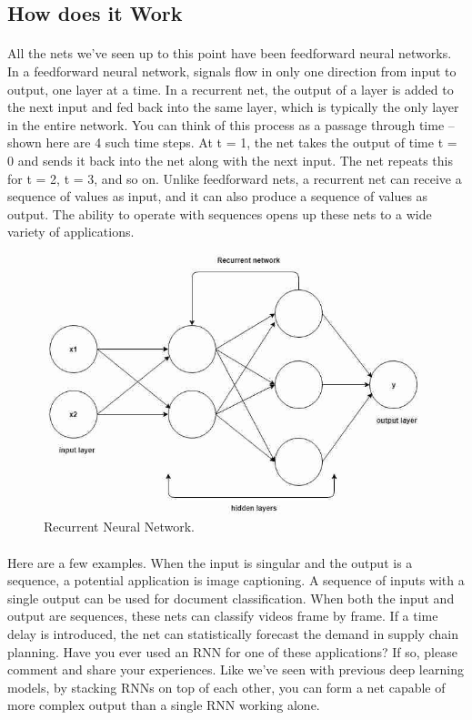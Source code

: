 \documentclass{article}
\begin{document}
  \subsection{How does it Work}
    \paragraph{}
    All the nets we’ve seen up to this point  have been feedforward neural networks. In  a feedforward neural network, signals flow  in only one direction from input to output,  one layer at a time. In a recurrent net, the  output of a layer is added to the next input  and fed back into the same layer, which is  typically the only layer in the entire network.  You can think of this process as a passage  through time – shown here are 4 such time  steps. At t = 1, the net takes the output  of time t = 0 and sends it back into the net  along with the next input. The net repeats  this for t = 2, t = 3, and so on.  Unlike feedforward nets, a recurrent net can  receive a sequence of values as input, and  it can also produce a sequence of values as  output. The ability to operate with sequences  opens up these nets to a wide variety of applications.

    \begin{figure}[h!]
      \begin{center}
        \includegraphics[width=0.8\linewidth]{img/Recurrent.jpeg}
        \caption{Recurrent Neural Network.}
        \label{fig:snn}
      \end{center}
    \end{figure}
    
    \paragraph{}
    Here are a few examples. When the input is  singular and the output is a sequence, a potential  application is image captioning. A sequence  of inputs with a single output can be used  for document classification. When both the  input and output are sequences, these nets  can classify videos frame by frame. If a time  delay is introduced, the net can statistically  forecast the demand in supply chain planning.  Have you ever used an RNN for one of these  applications? If so, please comment and share  your experiences.  Like we’ve seen with previous deep learning  models, by stacking RNNs on top of each other,  you can form a net capable of more complex  output than a single RNN working alone.
\end{document}
